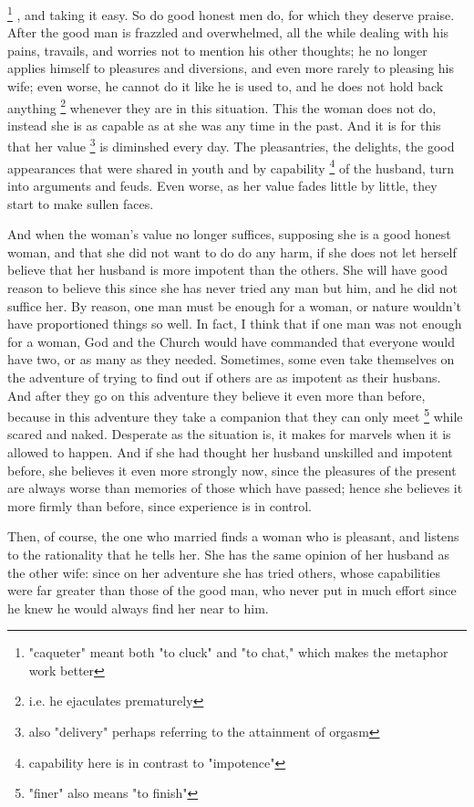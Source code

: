 \documentclass{book}
\begin{document}
\footnote{"caqueter" meant both "to cluck" and "to chat," which makes the metaphor work better}
, and taking it easy. So do good honest men do, for which they deserve praise. After the good man is frazzled and overwhelmed, all the while dealing with his pains, travails, and worries not to mention his other thoughts; he no longer applies himself to pleasures and diversions, and even more rarely to pleasing his wife; even worse, he cannot do it like he is used to, and he does not hold back anything
\footnote{i.e. he ejaculates prematurely}
whenever they are in this situation. This the woman does not do, instead she is as capable as at she was any time in the past. And it is for this that her value
\footnote{also "delivery" perhaps referring to the attainment of orgasm}
is diminshed every day. The pleasantries, the delights, the good appearances that were shared in youth and by capability
\footnote{capability here is in contrast to "impotence"}
of the husband, turn into arguments and feuds. Even worse, as her value fades little by little, they start to make sullen faces.

And when the woman's value no longer suffices, supposing she is a good honest woman, and that she did not want to do do any harm, if she does not let herself believe that her husband is more impotent than the others. She will have good reason to believe this since she has never tried any man but him, and he did not suffice her. By reason, one man must be enough for a woman, or nature wouldn't have proportioned things so well. In fact, I think that if one man was not enough for a woman, God and the Church would have commanded that everyone would have two, or as many as they needed. Sometimes, some even take themselves on the adventure of trying to find out if others are as impotent as their husbans. And after they go on this adventure they believe it even more than before, because in this adventure they take a companion that they can only meet
\footnote{"finer" also means "to finish"}
while scared and naked. Desperate as the situation is, it makes for marvels when it is allowed to happen. And if she had thought her husband unskilled and impotent before, she believes it even more strongly now, since the pleasures of the present are always worse than memories of those which have passed; hence she believes it more firmly than before, since experience is in control. 

Then, of course, the one who married finds a woman who is pleasant, and listens to the rationality that he tells her. She has the same opinion of her husband as the other wife: since on her adventure she has tried others, whose capabilities were far greater than those of the good man, who never put in much effort since he knew he would always find her near to him. 
\end{document}
